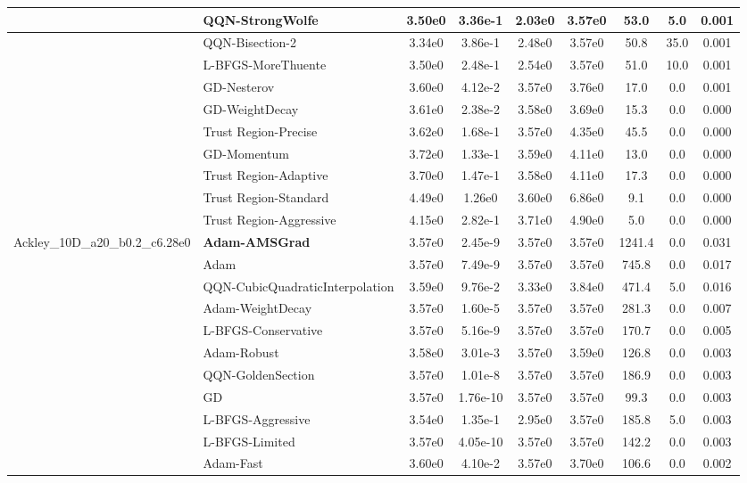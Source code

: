 \documentclass{article}
\begin{document}
\begin{longtable}{|l|l|c|c|c|c|c|c|c|}
 & QQN-StrongWolfe & 3.50e0 & 3.36e-1 & 2.03e0 & 3.57e0 & 53.0 & 5.0 & 0.001 \\
\hline
 & QQN-Bisection-2 & 3.34e0 & 3.86e-1 & 2.48e0 & 3.57e0 & 50.8 & 35.0 & 0.001 \\
\hline
 & L-BFGS-MoreThuente & 3.50e0 & 2.48e-1 & 2.54e0 & 3.57e0 & 51.0 & 10.0 & 0.001 \\
\hline
 & GD-Nesterov & 3.60e0 & 4.12e-2 & 3.57e0 & 3.76e0 & 17.0 & 0.0 & 0.001 \\
\hline
 & GD-WeightDecay & 3.61e0 & 2.38e-2 & 3.58e0 & 3.69e0 & 15.3 & 0.0 & 0.000 \\
\hline
 & Trust Region-Precise & 3.62e0 & 1.68e-1 & 3.57e0 & 4.35e0 & 45.5 & 0.0 & 0.000 \\
\hline
 & GD-Momentum & 3.72e0 & 1.33e-1 & 3.59e0 & 4.11e0 & 13.0 & 0.0 & 0.000 \\
\hline
 & Trust Region-Adaptive & 3.70e0 & 1.47e-1 & 3.58e0 & 4.11e0 & 17.3 & 0.0 & 0.000 \\
\hline
 & Trust Region-Standard & 4.49e0 & 1.26e0 & 3.60e0 & 6.86e0 & 9.1 & 0.0 & 0.000 \\
\hline
 & Trust Region-Aggressive & 4.15e0 & 2.82e-1 & 3.71e0 & 4.90e0 & 5.0 & 0.0 & 0.000 \\
Ackley\_10D\_a20\_b0.2\_c6.28e0 & \textbf{Adam-AMSGrad} & 3.57e0 & 2.45e-9 & 3.57e0 & 3.57e0 & 1241.4 & 0.0 & 0.031 \\
\hline
 & Adam & 3.57e0 & 7.49e-9 & 3.57e0 & 3.57e0 & 745.8 & 0.0 & 0.017 \\
\hline
 & QQN-CubicQuadraticInterpolation & 3.59e0 & 9.76e-2 & 3.33e0 & 3.84e0 & 471.4 & 5.0 & 0.016 \\
\hline
 & Adam-WeightDecay & 3.57e0 & 1.60e-5 & 3.57e0 & 3.57e0 & 281.3 & 0.0 & 0.007 \\
\hline
 & L-BFGS-Conservative & 3.57e0 & 5.16e-9 & 3.57e0 & 3.57e0 & 170.7 & 0.0 & 0.005 \\
\hline
 & Adam-Robust & 3.58e0 & 3.01e-3 & 3.57e0 & 3.59e0 & 126.8 & 0.0 & 0.003 \\
\hline
 & QQN-GoldenSection & 3.57e0 & 1.01e-8 & 3.57e0 & 3.57e0 & 186.9 & 0.0 & 0.003 \\
\hline
 & GD & 3.57e0 & 1.76e-10 & 3.57e0 & 3.57e0 & 99.3 & 0.0 & 0.003 \\
\hline
 & L-BFGS-Aggressive & 3.54e0 & 1.35e-1 & 2.95e0 & 3.57e0 & 185.8 & 5.0 & 0.003 \\
\hline
 & L-BFGS-Limited & 3.57e0 & 4.05e-10 & 3.57e0 & 3.57e0 & 142.2 & 0.0 & 0.003 \\
\hline
 & Adam-Fast & 3.60e0 & 4.10e-2 & 3.57e0 & 3.70e0 & 106.6 & 0.0 & 0.002 \\

\end{longtable}
\end{document}
